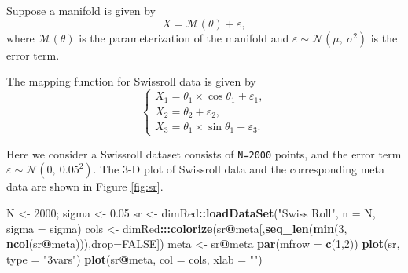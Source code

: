 \documentclass[11pt,a4paper,]{article}
\newenvironment{Shaded}{\begin{snugshade}}{\end{snugshade}}
\newcommand{\DataTypeTok}[1]{\textcolor[rgb]{0.13,0.29,0.53}{#1}}
\newcommand{\DecValTok}[1]{\textcolor[rgb]{0.00,0.00,0.81}{#1}}
\newcommand{\FloatTok}[1]{\textcolor[rgb]{0.00,0.00,0.81}{#1}}
\newcommand{\KeywordTok}[1]{\textcolor[rgb]{0.13,0.29,0.53}{\textbf{#1}}}
\newcommand{\NormalTok}[1]{#1}
\newcommand{\OperatorTok}[1]{\textcolor[rgb]{0.81,0.36,0.00}{\textbf{#1}}}
\newcommand{\OtherTok}[1]{\textcolor[rgb]{0.56,0.35,0.01}{#1}}
\newcommand{\StringTok}[1]{\textcolor[rgb]{0.31,0.60,0.02}{#1}}
\begin{document}
Suppose a manifold is given by
\[
X = \mathcal{M}(\theta) + \varepsilon,
\]
where \(\mathcal{M}(\theta)\) is the parameterization of the manifold and \(\varepsilon \sim \mathcal{N}(\mu, \ \sigma^{2})\) is the error term.

The mapping function for Swissroll data is given by
\[
\left\{ 
\begin{array}{lcl}
X_1 = \theta_1 \times \cos{\theta_1} + \varepsilon_1, \\
X_2 = \theta_2 + \varepsilon_2, \\
X_3 = \theta_1 \times \sin{\theta_1} + \varepsilon_3.
\end{array}
\right.
\]

Here we consider a Swissroll dataset consists of \texttt{N=2000} points, and the error term \(\varepsilon \sim \mathcal{N}(0, \ 0.05^{2})\). The 3-D plot of Swissroll data and the corresponding meta data are shown in Figure \ref{fig:sr}.

\begin{Shaded}
\begin{Highlighting}[]
\NormalTok{N \textless{}{-}}\StringTok{ }\DecValTok{2000}\NormalTok{; sigma \textless{}{-}}\StringTok{ }\FloatTok{0.05}
\NormalTok{sr \textless{}{-}}\StringTok{ }\NormalTok{dimRed}\OperatorTok{::}\KeywordTok{loadDataSet}\NormalTok{(}\StringTok{"Swiss Roll"}\NormalTok{, }\DataTypeTok{n =}\NormalTok{ N, }\DataTypeTok{sigma =}\NormalTok{ sigma)}
\NormalTok{cols \textless{}{-}}\StringTok{ }\NormalTok{dimRed}\OperatorTok{:::}\KeywordTok{colorize}\NormalTok{(sr}\OperatorTok{@}\NormalTok{meta[,}\KeywordTok{seq\_len}\NormalTok{(}\KeywordTok{min}\NormalTok{(}\DecValTok{3}\NormalTok{, }\KeywordTok{ncol}\NormalTok{(sr}\OperatorTok{@}\NormalTok{meta))),}\DataTypeTok{drop=}\OtherTok{FALSE}\NormalTok{])}
\NormalTok{meta \textless{}{-}}\StringTok{ }\NormalTok{sr}\OperatorTok{@}\NormalTok{meta}
\KeywordTok{par}\NormalTok{(}\DataTypeTok{mfrow =} \KeywordTok{c}\NormalTok{(}\DecValTok{1}\NormalTok{,}\DecValTok{2}\NormalTok{))}
\KeywordTok{plot}\NormalTok{(sr, }\DataTypeTok{type =} \StringTok{"3vars"}\NormalTok{)}
\KeywordTok{plot}\NormalTok{(sr}\OperatorTok{@}\NormalTok{meta, }\DataTypeTok{col =}\NormalTok{ cols, }\DataTypeTok{xlab =} \StringTok{""}\NormalTok{)}
\end{Highlighting}
\end{Shaded}
\end{document}

